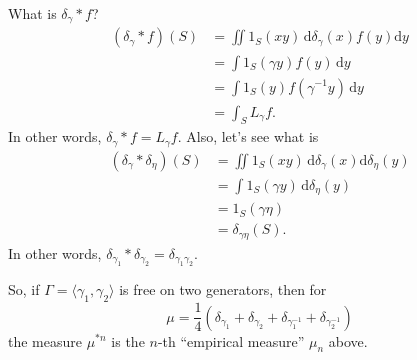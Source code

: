 \documentclass{article}
\newcommand{\dd}{\mathrm{d}}
\begin{document}
What is $\delta_\gamma\ast f$?
\begin{align*}
	(\delta_\gamma\ast f)(S) 
		&= \iint 1_S(x y) \, \dd \delta_\gamma(x) f(y)\dd y \\
		&= \int 1_S(\gamma y) f(y)\, \dd y \\
		&= \int 1_S(y) f(\gamma^{-1} y)\, \dd y \\
		&= \int_S L_\gamma f .
\end{align*}
In other words, $\delta_\gamma\ast f = L_\gamma f$. Also, let's see what is 
\begin{align*}
	(\delta_\gamma \ast \delta_\eta)(S) 
		&= \iint 1_S(x y)\, \dd \delta_\gamma(x) \dd \delta_\eta(y) \\
		&= \int 1_S(\gamma y)\, \dd \delta_\eta(y) \\
		&= 1_S(\gamma\eta) \\
		&= \delta_{\gamma\eta}(S) .
\end{align*}
In other words, 
$\delta_{\gamma_1} \ast \delta_{\gamma_2} = \delta_{\gamma_1 \gamma_2}$. 

So, if $\Gamma=\langle \gamma_1,\gamma_2\rangle$ is free on two generators, then 
for 
\[
	\mu = \frac 1 4 \left(\delta_{\gamma_1} + \delta_{\gamma_2} + \delta_{\gamma_1^{-1}} + \delta_{\gamma_2^{-1}}\right) 
\]
the measure $\mu^{\ast n}$ is the $n$-th ``empirical measure'' $\mu_n$ above. 
\end{document}
